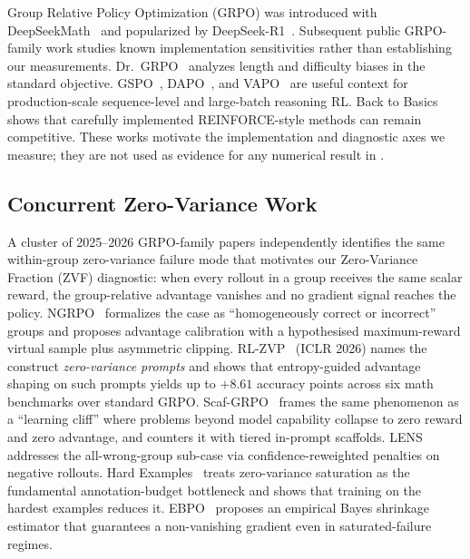 Group Relative Policy Optimization (GRPO) was introduced with
DeepSeekMath~\cite{shao2024deepseekmath} and popularized by
DeepSeek-R1~\cite{guo2025deepseekr1, guo2025deepseekr1nature}. Subsequent
public GRPO-family work studies known implementation sensitivities rather than
establishing our measurements. Dr.~GRPO~\cite{liu2025drgrpo} analyzes length
and difficulty biases in the standard objective. GSPO~\cite{qwen2025gspo},
DAPO~\cite{yu2025dapo}, and VAPO~\cite{bytedance2025vapo} are useful context
for production-scale sequence-level and large-batch reasoning RL. Back to
Basics~\cite{ahmadian2024backtobasics} shows that carefully implemented
REINFORCE-style methods can remain competitive. These works motivate the
implementation and diagnostic axes we measure; they are not used as evidence
for any numerical result in \ours{}.

\subsection{Concurrent Zero-Variance Work}
\label{sec:related:concurrent-zv}

A cluster of 2025--2026 GRPO-family papers independently identifies the same
within-group zero-variance failure mode that motivates our Zero-Variance
Fraction (ZVF) diagnostic: when every rollout in a group receives the same
scalar reward, the group-relative advantage vanishes and no gradient signal
reaches the policy. NGRPO~\cite{nan2025ngrpo} formalizes the case as
``homogeneously correct or incorrect'' groups and proposes advantage
calibration with a hypothesised maximum-reward virtual sample plus asymmetric
clipping. RL-ZVP~\cite{le2025rlzvp} (ICLR 2026) names the construct
\emph{zero-variance prompts} and shows that entropy-guided advantage shaping
on such prompts yields up to $+8.61$ accuracy points across six math
benchmarks over standard GRPO. Scaf-GRPO~\cite{zhang2025scafgrpo} frames the
same phenomenon as a ``learning cliff'' where problems beyond model capability
collapse to zero reward and zero advantage, and counters it with tiered
in-prompt scaffolds. LENS~\cite{feng2025lens} addresses the all-wrong-group
sub-case via confidence-reweighted penalties on negative rollouts. Hard
Examples~\cite{pikus2025hardexamples} treats zero-variance saturation as the
fundamental annotation-budget bottleneck and shows that training on the
hardest examples reduces it. EBPO~\cite{han2026ebpo} proposes an empirical
Bayes shrinkage estimator that guarantees a non-vanishing gradient even in
saturated-failure regimes.

